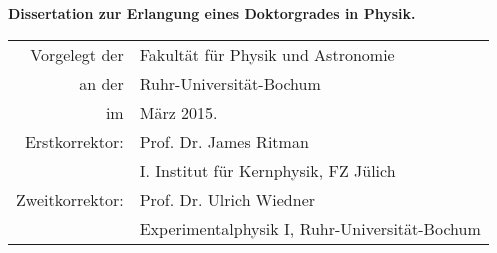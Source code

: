 
\begin{center}\RobotoSlab\vspace*{10mm}

\huge \textbf{\Title}\vspace{12mm}

\Large        \Author






\large \textbf{Dissertation zur Erlangung eines Doktorgrades in Physik.}\vspace{10mm}


\small
\begin{tabular}{rl}
    Vorgelegt der & \large Fakult\"at f\"ur Physik und Astronomie \\[2mm]
           an der & \large Ruhr-Universit\"at-Bochum \\[2mm]
               im & \large M\"arz 2015.\\[10mm]
   Erstkorrektor: & \large Prof. Dr. James Ritman \\[1mm]
                  & I. Institut f\"ur Kernphysik, FZ J\"ulich \\[4mm]
  Zweitkorrektor: & \large Prof. Dr. Ulrich Wiedner \\[1mm]
                  & Experimentalphysik I, Ruhr-Universit\"at-Bochum
\end{tabular}


\end{center}

\thispagestyle{empty}
\cleardoublepage

\setlength{\topmargin}{0mm}
\normalsize%
